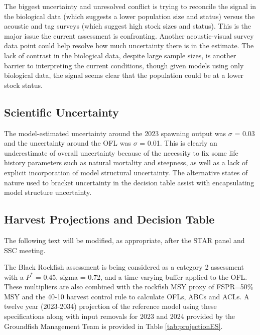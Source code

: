 \documentclass[11pt,
  english,
  letterpaper,
]{article}
\begin{document}
The biggest uncertainty and unresolved conflict is trying to reconcile the signal in the biological data (which suggests a lower population size and status) versus the acoustic and tag surveys (which suggest high stock sizes and status). This is the major issue the current assessment is confronting. Another acoustic-visual survey data point could help resolve how much uncertainty there is in the estimate. The lack of contrast in the biological data, despite large sample sizes, is another barrier to interpreting the current conditions, though given models using only biological data, the signal seems clear that the population could be at a lower stock status.

\hypertarget{scientific-uncertainty}{%
\subsection*{Scientific Uncertainty}\label{scientific-uncertainty}}

The model-estimated uncertainty around the 2023 spawning output was \(\sigma\) = 0.03 and the uncertainty around the OFL was \(\sigma\) = 0.01. This is clearly an underestimate of overall uncertainty because of the necessity to fix some life history parameters such as natural mortality and steepness, as well as a lack of explicit incorporation of model structural uncertainty. The alternative states of nature used to bracket uncertainty in the decision table assist with encapsulating model structure uncertainty.

\hypertarget{harvest-projections-and-decision-table}{%
\subsection*{Harvest Projections and Decision Table}\label{harvest-projections-and-decision-table}}

The following text will be modified, as appropriate, after the STAR panel and SSC meeting.

The Black Rockfish assessment is being considered as a category 2 assessment with a \(P^*\) = 0.45, sigma = 0.72, and a time-varying buffer applied to the OFL. These multipliers are also combined with the rockfish MSY proxy of FSPR=50\% MSY and the 40-10 harvest control rule to calculate OFLs, ABCs and ACLs. A twelve year (2023-2034) projection of the reference model using these specifications along with input removals for 2023 and 2024 provided by the Groundfish Management Team is provided in Table \ref{tab:projectionES}.
\end{document}
